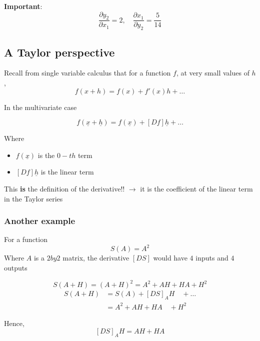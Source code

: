 \textbf{Important}:
\[
  \frac{\partial y_2}{\partial x_1} = 2, \quad  \frac{\partial x_1}{\partial y_2} = \frac{5}{14}
\] 


\subsection{A Taylor perspective}

Recall from single variable calculus that for a function $f$, at very small values of $h$,
\[
  f(x + h) = f(x) + f'(x)h + \hdots
\] 

In the multivariate case

\[
   f( \underline{x} + \underline{h}) = f( \underline{x}) + [Df] \underline{h} + \hdots
\] 

Where \begin{itemize}
   \item $f( \underline{x})$ is the $0-th$ term
   \item $[Df] \underline{h}$ is the linear term
\end{itemize}

This \textbf{is} the definition of the derivative!! $\rightarrow$ it is the coefficient of the linear term in the Taylor series

\subsubsection{Another example}

For a function
\[
  S(A) = A^2
\] 
Where $A$ is a $2 by 2$ matrix, the derivative $[DS]$ would have $4$ inputs and $4$ outputs

\[
  S(A+H) = (A+H)^2 = A^2 + AH + HA + H^2
\] 
\begin{align*}
   S(A+H) &= S(A) + [DS]_{A}H \quad + \hdots\\
          &= A^2  +  AH + HA \quad +  H^2
\end{align*}

Hence,
\[
   [DS]_{A}H = AH + HA
\] 
 

